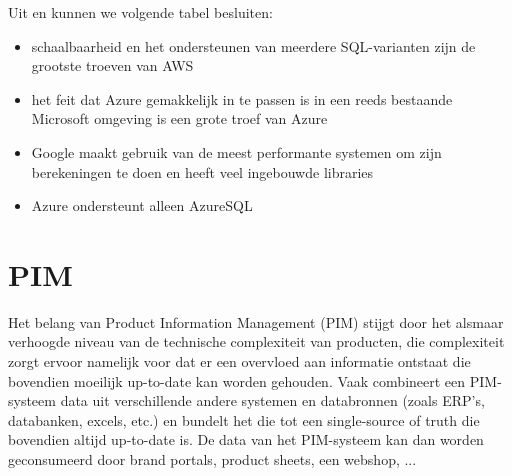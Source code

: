 Uit \textcite{Pallavi2020} en \textcite{Madhuri2016} kunnen we volgende tabel besluiten: 
\begin{itemize}
    \item schaalbaarheid en het ondersteunen van meerdere SQL-varianten zijn de grootste troeven van AWS
    \item het feit dat Azure gemakkelijk in te passen is in een reeds bestaande Microsoft omgeving is een grote troef van Azure
    \item Google maakt gebruik van de meest performante systemen om zijn berekeningen te doen en heeft veel ingebouwde libraries
    \item Azure ondersteunt alleen AzureSQL
\end{itemize}


\section{PIM}
Het belang van Product Information Management (PIM) stijgt door het alsmaar verhoogde niveau van de technische complexiteit  van producten, die complexiteit zorgt ervoor namelijk voor dat er een overvloed aan informatie ontstaat die bovendien moeilijk up-to-date kan worden gehouden. \autocite{Fr_mling_2006} Vaak combineert een PIM-systeem data uit verschillende andere systemen en databronnen (zoals ERP's, databanken, excels, etc.) en bundelt het die tot een single-source of truth die bovendien altijd up-to-date is. De data van het PIM-systeem kan dan worden geconsumeerd door brand portals, product sheets, een webshop, ...


